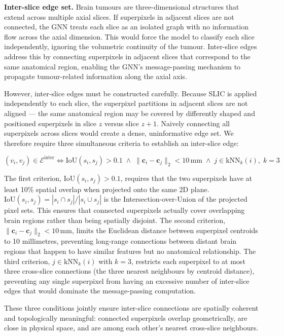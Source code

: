 \documentclass{article}
\begin{document}
\textbf{Inter-slice edge set.}
Brain tumours are three-dimensional structures that extend across multiple axial
slices. If superpixels in adjacent slices are not connected, the GNN treats each
slice as an isolated graph with no information flow across the axial dimension.
This would force the model to classify each slice independently, ignoring the
volumetric continuity of the tumour. Inter-slice edges address this by connecting
superpixels in adjacent slices that correspond to the same anatomical region,
enabling the GNN's message-passing mechanism to propagate tumour-related
information along the axial axis.

However, inter-slice edges must be constructed carefully. Because SLIC is applied
independently to each slice, the superpixel partitions in adjacent slices are not
aligned --- the same anatomical region may be covered by differently shaped and
positioned superpixels in slice $z$ versus slice $z+1$. Naively connecting all
superpixels across slices would create a dense, uninformative edge set. We
therefore require three simultaneous criteria to establish an inter-slice edge:

\[
    (v_i, v_j) \in \mathcal{E}^{\text{inter}} \iff
    \mathrm{IoU}(s_i, s_j) > 0.1 \;\wedge\;
    \|\mathbf{c}_i - \mathbf{c}_j\|_2 < 10\,\text{mm} \;\wedge\;
    j \in \mathrm{kNN}_k(i),\; k = 3
\]

The first criterion, $\mathrm{IoU}(s_i, s_j) > 0.1$, requires that the two
superpixels have at least 10\% spatial overlap when projected onto the same 2D
plane. $\mathrm{IoU}(s_i, s_j) = |s_i \cap s_j| / |s_i \cup s_j|$ is the
Intersection-over-Union of the projected pixel sets. This ensures that connected
superpixels actually cover overlapping brain regions rather than being spatially
disjoint. The second criterion, $\|\mathbf{c}_i - \mathbf{c}_j\|_2 < 10\,\text{mm}$,
limits the Euclidean distance between superpixel centroids to 10 millimetres,
preventing long-range connections between distant brain regions that happen to have
similar features but no anatomical relationship. The third criterion,
$j \in \mathrm{kNN}_k(i)$ with $k = 3$, restricts each superpixel to at most
three cross-slice connections (the three nearest neighbours by centroid distance),
preventing any single superpixel from having an excessive number of inter-slice
edges that would dominate the message-passing computation.

These three conditions jointly ensure inter-slice connections are spatially
coherent and topologically meaningful: connected superpixels overlap
geometrically, are close in physical space, and are among each other's nearest
cross-slice neighbours.
\end{document}

